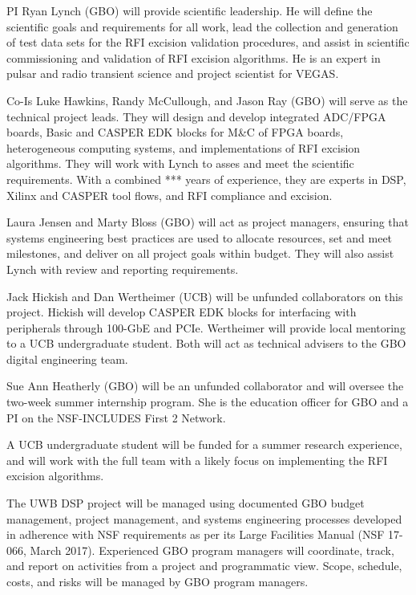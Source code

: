 \documentclass[10pt]{myNSF}
\begin{document}
\begin{itemize*}
\item{PI Ryan Lynch (GBO) will provide scientific leadership.  He will
  define the scientific goals and requirements for all work, lead the
  collection and generation of test data sets for the RFI excision
  validation procedures, and assist in scientific commissioning and
  validation of RFI excision algorithms.  He is an expert in pulsar
  and radio transient science and project scientist for VEGAS.}
\item{Co-Is Luke Hawkins, Randy McCullough, and Jason Ray (GBO) will
  serve as the technical project leads.  They will design and develop
  integrated ADC/FPGA boards, Basic and CASPER EDK blocks for M\&C of
  FPGA boards, heterogeneous computing systems, and implementations of
  RFI excision algorithms.  They will work with Lynch to asses and
  meet the scientific requirements.  With a combined *** years of
  experience, they are experts in DSP, Xilinx and CASPER tool flows,
  and RFI compliance and excision.}
\item{Laura Jensen and Marty Bloss (GBO) will act as project managers,
  ensuring that systems engineering best practices are used to
  allocate resources, set and meet milestones, and deliver on all
  project goals within budget.  They will also assist Lynch with
  review and reporting requirements.}
\item{Jack Hickish and Dan Wertheimer (UCB) will be unfunded
  collaborators on this project.  Hickish will develop CASPER EDK
  blocks for interfacing with peripherals through 100-GbE and PCIe.
  Wertheimer will provide local mentoring to a UCB undergraduate
  student.  Both will act as technical advisers to the GBO digital
  engineering team.}
\item{Sue Ann Heatherly (GBO) will be an unfunded collaborator and
  will oversee the two-week summer internship program.  She is the
  education officer for GBO and a PI on the NSF-INCLUDES First 2
  Network.}
\item{A UCB undergraduate student will be funded for a summer research
  experience, and will work with the full team with a likely focus on
  implementing the RFI excision algorithms.}
\end{itemize*}
  
\label{sec:organization}

The UWB DSP project will be managed using documented GBO budget
management, project management, and systems engineering processes
developed in adherence with NSF requirements as per its Large
Facilities Manual (NSF 17-066, March 2017). Experienced GBO program
managers will coordinate, track, and report on activities from a
project and programmatic view.  Scope, schedule, costs, and risks will
be managed by GBO program managers.
\end{document}
